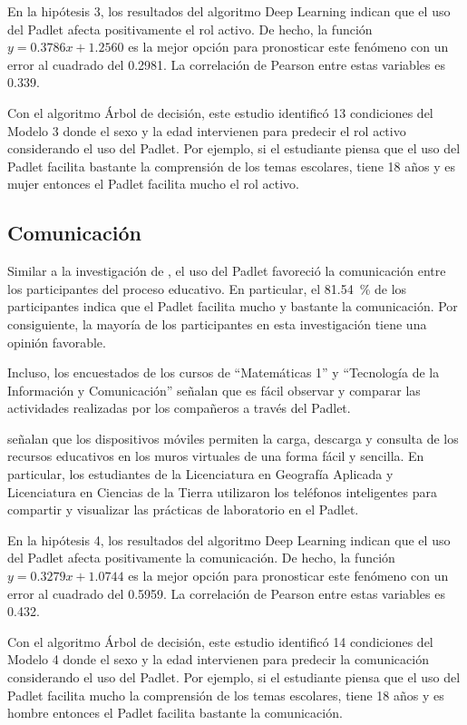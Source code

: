 \documentclass[spanish]{textolivre}
\begin{document}
En la hipótesis 3, los resultados del algoritmo Deep Learning indican que el uso del Padlet afecta positivamente el rol activo. De hecho, la función $y = 0.3786x + 1.2560$ es la mejor opción para pronosticar este fenómeno con un error al cuadrado del 0.2981. La correlación de Pearson entre estas variables es 0.339.

Con el algoritmo Árbol de decisión, este estudio identificó 13 condiciones del Modelo 3 donde el sexo y la edad intervienen para predecir el rol activo considerando el uso del Padlet. Por ejemplo, si el estudiante piensa que el uso del Padlet facilita bastante la comprensión de los temas escolares, tiene 18 años y es mujer entonces el Padlet facilita mucho el rol activo.


\subsection{Comunicación}\label{sec-figuras-tabelas}
Similar a la investigación de \textcite{lee2023}, el uso del Padlet favoreció la comunicación entre los participantes del proceso educativo. En particular, el 81.54~\% de los participantes indica que el Padlet facilita mucho y bastante la comunicación. Por consiguiente, la mayoría de los participantes en esta investigación tiene una opinión favorable.

Incluso, los encuestados de los cursos de “Matemáticas 1” y “Tecnología de la Información y Comunicación” señalan que es fácil observar y comparar las actividades realizadas por los compañeros a través del Padlet.

\textcite{siantuba2023} señalan que los dispositivos móviles permiten la carga, descarga y consulta de los recursos educativos en los muros virtuales de una forma fácil y sencilla. En particular, los estudiantes de la Licenciatura en Geografía Aplicada y Licenciatura en Ciencias de la Tierra utilizaron los teléfonos inteligentes para compartir y visualizar las prácticas de laboratorio en el Padlet.

En la hipótesis 4, los resultados del algoritmo Deep Learning indican que el uso del Padlet afecta positivamente la comunicación. De hecho, la función $y = 0.3279x + 1.0744$ es la mejor opción para pronosticar este fenómeno con un error al cuadrado del 0.5959. La correlación de Pearson entre estas variables es 0.432.

Con el algoritmo Árbol de decisión, este estudio identificó 14 condiciones del Modelo 4 donde el sexo y la edad intervienen para predecir la comunicación considerando el uso del Padlet.  Por ejemplo, si el estudiante piensa que el uso del Padlet facilita mucho la comprensión de los temas escolares, tiene 18 años y es hombre entonces el Padlet facilita bastante la comunicación.
\end{document}
